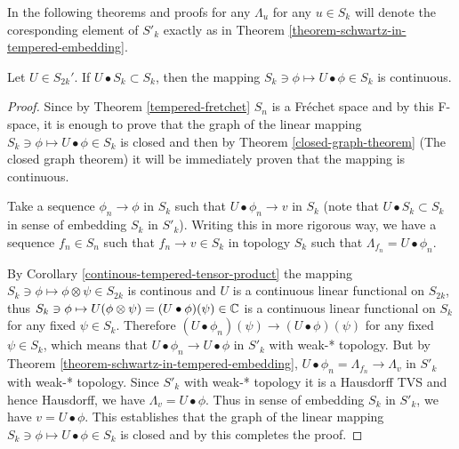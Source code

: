 \documentclass[main.tex]{subfiles}
\begin{document}
In the following theorems and proofs for any $\Lambda_u$ for any $u\in S_k$ will denote the coresponding element of $S'_k$ exactly as in Theorem \ref{theorem-schwartz-in-tempered-embedding}.
\begin{theorem}
\label{general-matrix-continuous}
Let $U\in S_{2k}'$. If $U\bullet S_k\subset S_k$, then the mapping $S_k\ni\phi\mapsto U\bullet\phi\in S_k$ is continuous.
\end{theorem}
\begin{proof}
Since by Theorem \ref{tempered-fretchet} $S_n$ is a Fr\'echet space and by this F-space,
it is enough to prove that the graph of the linear mapping $S_k\ni\phi\mapsto U\bullet\phi\in S_k$ is closed and then by Theorem \ref{closed-graph-theorem} (The closed graph theorem) it will be immediately proven that the mapping is continuous.

\noindent
Take a sequence $\phi_n\to \phi$ in $S_k$ such that $U\bullet \phi_n \to v$ in $S_k$ (note that $U\bullet S_k\subset S_k$ in sense of embedding $S_k$ in $S'_k$). Writing this in more rigorous way, we have a sequence $f_n\in S_n$ such that $f_n\to v\in S_k$ in topology $S_k$ such that $\Lambda_{f_n} = U\bullet \phi_n$.

\noindent
By Corollary \ref{continous-tempered-tensor-product} the mapping $S_k\ni\phi \mapsto \phi \otimes \psi\in S_{2k}$ is continous and $U$ is a continuous linear functional on $S_{2k}$, thus $S_k\ni\phi \mapsto U(\phi\otimes\psi) = (U\bullet \phi)(\psi)\in \mathbb{C}$ is a continuous linear functional on $S_k$ for any fixed $\psi\in S_k$. Therefore $(U\bullet \phi_n)(\psi)\to (U\bullet \phi)(\psi)$ for any fixed $\psi \in S_k$, which means that $U\bullet \phi_n\to U\bullet \phi$ in $S'_k$ with weak-* topology. But by Theorem \ref{theorem-schwartz-in-tempered-embedding}, $U\bullet \phi_n = \Lambda_{f_n}\to \Lambda_v$ in $S'_k$ with weak-* topology. Since $S'_k$ with weak-* topology it is a Hausdorff TVS and hence Hausdorff, we have $\Lambda_v = U\bullet \phi$. Thus in sense of embedding $S_k$ in $S'_k$, we have $v = U\bullet \phi$. This establishes that the graph of the linear mapping $S_k\ni\phi\mapsto U\bullet\phi\in S_k$ is closed and by this completes the proof. 
\end{proof}
\end{document}
